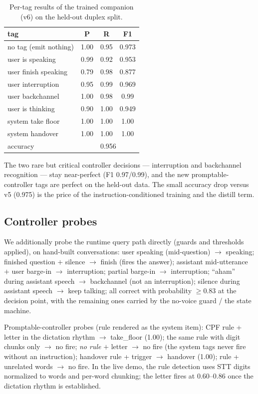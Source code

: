 \documentclass[conference]{IEEEtran}
\begin{document}
\begin{table}[htbp]
\centering
\caption{Per-tag results of the trained companion (v6) on the held-out
duplex split.}
\label{tab:tags}
\begin{tabular}{lccc}
\hline
\textbf{tag} & \textbf{P} & \textbf{R} & \textbf{F1}\\
\hline
no tag (emit nothing) & 1.00 & 0.95 & 0.973\\
user is speaking & 0.99 & 0.92 & 0.953\\
user finish speaking & 0.79 & 0.98 & 0.877\\
user interruption & 0.95 & 0.99 & 0.969\\
user backchannel & 1.00 & 0.98 & 0.99\\
user is thinking & 0.90 & 1.00 & 0.949\\
system take floor & 1.00 & 1.00 & 1.00\\
system handover & 1.00 & 1.00 & 1.00\\
\hline
accuracy & \multicolumn{3}{c}{0.956}\\
\hline
\end{tabular}
\end{table}

The two rare but critical controller decisions — interruption and
backchannel recognition — stay near-perfect (F1 0.97/0.99), and the new
promptable-controller tags are perfect on the held-out data. The small
accuracy drop versus v5 (0.975) is the price of the instruction-conditioned
training and the distill term.

\subsection{Controller probes}
We additionally probe the runtime query path directly (guards and
thresholds applied), on hand-built conversations: user speaking
(mid-question) $\rightarrow$ speaking; finished question $+$ silence
$\rightarrow$ finish (fires the answer); assistant mid-utterance $+$ user
barge-in $\rightarrow$ interruption; partial barge-in $\rightarrow$
interruption; ``aham'' during assistant speech $\rightarrow$ backchannel
(not an interruption); silence during assistant speech $\rightarrow$ keep
talking; all correct with probability $\geq 0.83$ at the decision point,
with the remaining ones carried by the no-voice guard / the state machine.

Promptable-controller probes (rule rendered as the system item): CPF rule +
letter in the dictation rhythm $\rightarrow$ take\_floor (1.00); the same
rule with digit chunks only $\rightarrow$ no fire; \emph{no rule} $+$ letter
$\rightarrow$ no fire (the system tags never fire without an instruction);
handover rule + trigger $\rightarrow$ handover (1.00); rule + unrelated words
$\rightarrow$ no fire. In the live demo, the rule detection uses STT digits
normalized to words and per-word chunking; the letter fires at 0.60--0.86
once the dictation rhythm is established.
\end{document}
